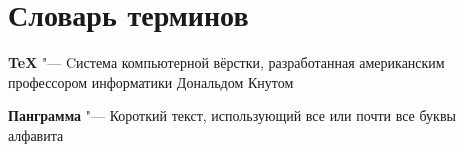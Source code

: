 \chapter*{Словарь терминов}             %

\textbf{TeX} "--- Cистема компьютерной вёрстки, разработанная американским профессором информатики Дональдом Кнутом

\textbf{Панграмма} "--- Короткий текст, использующий все или почти все буквы алфавита
